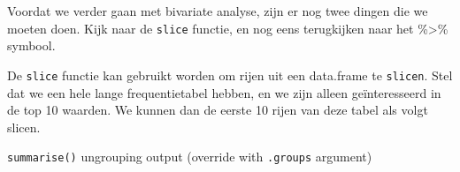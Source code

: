 \documentclass[]{tufte-book}
\newenvironment{Shaded}{}{}
\newcommand{\DataTypeTok}[1]{\textcolor[rgb]{0.56,0.13,0.00}{#1}}
\newcommand{\DecValTok}[1]{\textcolor[rgb]{0.25,0.63,0.44}{#1}}
\newcommand{\KeywordTok}[1]{\textcolor[rgb]{0.00,0.44,0.13}{\textbf{#1}}}
\newcommand{\NormalTok}[1]{#1}
\newcommand{\OperatorTok}[1]{\textcolor[rgb]{0.40,0.40,0.40}{#1}}
\newcommand{\StringTok}[1]{\textcolor[rgb]{0.25,0.44,0.63}{#1}}
\begin{document}
Voordat we verder gaan met bivariate analyse, zijn er nog twee dingen die we moeten doen. Kijk naar de \texttt{slice} functie, en nog eens terugkijken naar het \%\textgreater\% symbool.

De \texttt{slice} functie kan gebruikt worden om rijen uit een data.frame te \texttt{slicen}. Stel dat we een hele lange frequentietabel hebben, en we zijn alleen geïnteresseerd in de top 10 waarden. We kunnen dan de eerste 10 rijen van deze tabel als volgt slicen.

\begin{Shaded}
\end{Shaded}

\texttt{summarise()} ungrouping output (override with \texttt{.groups} argument)
\end{document}
